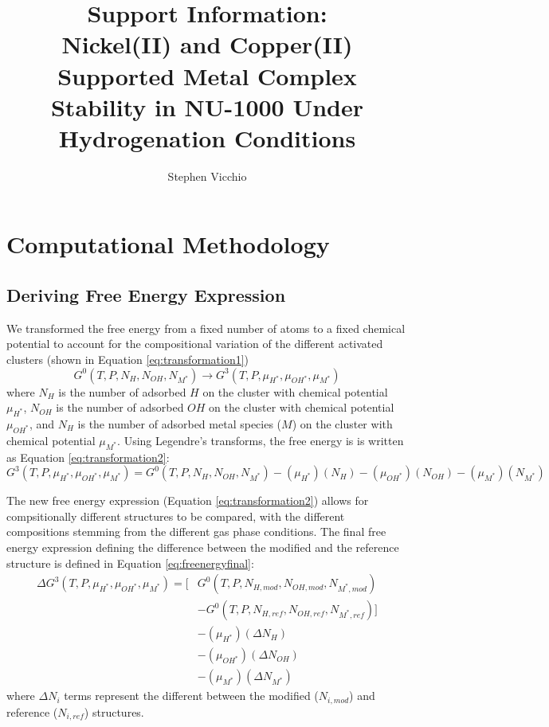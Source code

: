 \documentclass[12pt]{article}
\title{Support Information: \\
Nickel(II) and Copper(II) Supported Metal Complex Stability in NU-1000 Under Hydrogenation Conditions}
\author{Stephen Vicchio}
\begin{document}
\maketitle


\section{Computational Methodology}
\subsection{Deriving Free Energy Expression}
We transformed the free energy from a fixed number of atoms to a fixed chemical potential to account for the compositional variation of the different activated clusters (shown in Equation \ref{eq:transformation1})
\begin{equation}
    G^{0}(T,P,N_{H},N_{OH},N_{M^{*}}) \rightarrow G^{3}(T,P,\mu_{H^{*}},\mu_{OH^{*}},\mu_{M^{*}})
    \label{eq:transformation1}
\end{equation}
where $N_{H}$ is the number of adsorbed $H$ on the cluster with chemical potential $\mu_{H^{*}}$, $N_{OH}$ is the number of adsorbed $OH$ on the cluster with chemical potential $\mu_{OH^{*}}$, and $N_{H}$ is the number of adsorbed metal species ($M$) on the cluster with chemical potential $\mu_{M^{*}}$. Using Legendre's transforms, the free energy is is written as Equation \ref{eq:transformation2}:
\begin{equation}
    G^{3}(T,P,\mu_{H^{*}},\mu_{OH^{*}},\mu_{M^{*}}) = G^{0}(T,P,N_{H},N_{OH},N_{M^{*}}) - (\mu_{H^{*}})(N_{H}) - (\mu_{OH^{*}})(N_{OH}) - (\mu_{M^{*}})(N_{M^{*}})  
    \label{eq:transformation2}
\end{equation}

The new free energy expression (Equation \ref{eq:transformation2}) allows for compsitionally different structures to be compared, with the different compositions stemming from the different gas phase conditions. The final free energy expression defining the difference between the modified and the reference structure is defined in Equation \ref{eq:freenergyfinal}:
\begin{equation}
    \begin{split}
        \Delta G^{3}(T,P,\mu_{H^{*}},\mu_{OH^{*}},\mu_{M^{*}}) = \Big[&G^{0}(T,P,N_{H,mod},N_{OH,mod},N_{M^{*},mod}) \\ &- G^{0}(T,P,N_{H,ref},N_{OH,ref},N_{M^{*},ref}) \Big] \\ &- (\mu_{H^{*}})(\Delta N_{H}) \\ &- (\mu_{OH^{*}})(\Delta N_{OH}) \\ &- (\mu_{M^{*}})(\Delta N_{M^{*}}) 
    \end{split}
    \label{eq:freenergyfinal}
\end{equation}
where $\Delta N_{i}$ terms represent the different between the modified ($N_{i,mod}$) and reference ($N_{i,ref}$) structures. 
\end{document}
